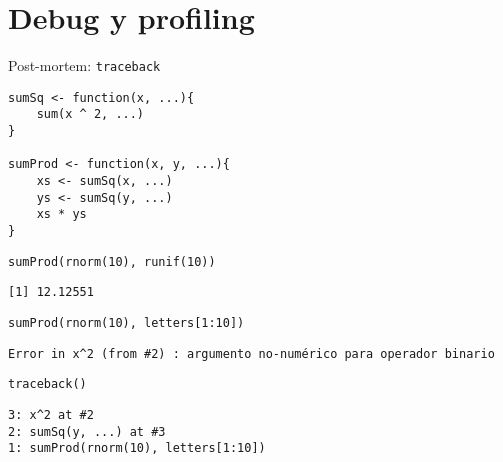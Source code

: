 \documentclass[xcolor={usenames,svgnames,dvipsnames}]{beamer}
\begin{document}
\section{Debug y profiling}
\label{sec:orgheadline27}

\begin{frame}[fragile,label={sec:orgheadline20}]{Post-mortem: \texttt{traceback}}
 \lstset{language=R,label= ,caption= ,captionpos=b,numbers=none}
\begin{lstlisting}
sumSq <- function(x, ...){
    sum(x ^ 2, ...)
}

sumProd <- function(x, y, ...){
    xs <- sumSq(x, ...)
    ys <- sumSq(y, ...)
    xs * ys
}
\end{lstlisting}

\lstset{language=R,label= ,caption= ,captionpos=b,numbers=none}
\begin{lstlisting}
sumProd(rnorm(10), runif(10))
\end{lstlisting}

\begin{verbatim}
[1] 12.12551
\end{verbatim}

\lstset{language=R,label= ,caption= ,captionpos=b,numbers=none}
\begin{lstlisting}
sumProd(rnorm(10), letters[1:10])
\end{lstlisting}

\begin{verbatim}
Error in x^2 (from #2) : argumento no-numérico para operador binario
\end{verbatim}

\lstset{language=R,label= ,caption= ,captionpos=b,numbers=none}
\begin{lstlisting}
traceback()
\end{lstlisting}

\begin{verbatim}
3: x^2 at #2
2: sumSq(y, ...) at #3
1: sumProd(rnorm(10), letters[1:10])
\end{verbatim}
\end{frame}
\end{document}
